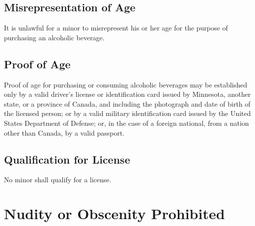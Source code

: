 \subsection{Misrepresentation of Age}
It is unlawful for a minor to misrepresent his or her age for the purpose of purchasing an alcoholic beverage.
\subsection{Proof of Age}
Proof of age for purchasing or consuming alcoholic beverages may be established only by a valid driver’s license or identification card issued by Minnesota, another state, or a province of Canada, and including the photograph and date of birth of the licensed person; or by a valid military identification card issued by the United States Department of Defense; or, in the case of a foreign national, from a nation other than Canada, by a valid passport.
\subsection{Qualification for License}
No minor shall qualify for a license.

\section{Nudity or Obscenity Prohibited}
